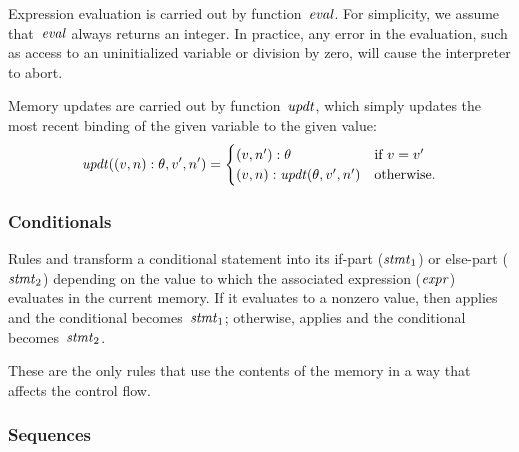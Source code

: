 Expression evaluation is carried out by function~$\mathop{\mathit{eval}}$.  For
simplicity, we assume that~$\mathop{\mathit{eval}}$ always returns an integer.  In
practice, any error in the evaluation, such as access to an uninitialized
variable or division by zero, will cause the interpreter to abort.

Memory updates are carried out by function~$\mathop{\mathit{updt}}$, which simply updates
the most recent binding of the given variable to the given value:
\[
  \mathop{\mathit{updt}}((v,n):\theta,v',n')=
  \begin{cases}
    (v,n'):\theta             &\text{if~$v=v'$}\\
    (v,n):\mathop{\mathit{updt}}(\theta,v',n') &\text{otherwise}.
  \end{cases}
\]

\subsubsection*{Conditionals}


Rules  and  transform a conditional statement into
its if-part ($\mathit{stmt}_1$) or else-part ($\mathit{stmt}_2$) depending on the value to
which the associated expression ($\mathit{expr}$) evaluates in the current memory.
If it evaluates to a nonzero value, then  applies and the
conditional becomes~$\mathit{stmt}_1$; otherwise,  applies and the
conditional becomes~$\mathit{stmt}_2$.

These are the only rules that use the contents of the memory in a way that
affects the control flow.

\subsubsection*{Sequences}


